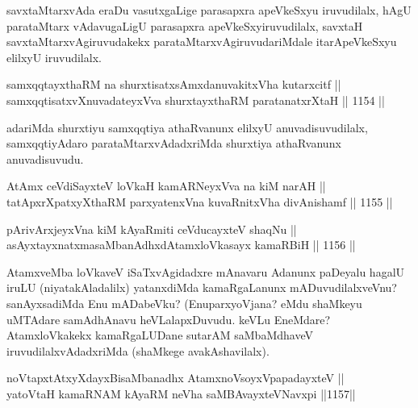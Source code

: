 \begin{artha}
savxtaMtarxvAda eraDu vasutxgaLige parasapxra apeVkeSxyu iruvudilalx, hAgU parataMtarx vAdavugaLigU parasapxra apeVkeSxyiruvudilalx, savxtaH savxtaMtarxvAgiruvudakekx parataMtarxvAgiruvudariMdale itarApeVkeSxyu elilxyU iruvudilalx.
\end{artha}

\begin{shl}
samxqqtayxthaRM na shurxtisatxsAmxdanuvakitxVha kutarxcitf ||  \\
samxqqtisatxvXnuvadateyxVva shurxtayxthaRM paratanatxrXtaH \hfill || 1154 ||  
\end{shl}

\begin{artha}
adariMda shurxtiyu samxqqtiya athaRvanunx elilxyU anuvadisuvudilalx, samxqqtiyAdaro parataMtarxvAdadxriMda shurxtiya athaRvanunx anuvadisuvudu.
\end{artha}



\begin{shl}
AtAmx ceVdiSayxteV loVkaH kamARNeyxVva na kiM narAH || \\
tatApxrXpatxyXthaRM parxyatenxVna kuvaRnitxVha divAnishamf \hfill || 1155 ||  
\end{shl}
				
\begin{shl}
pArivArxjeyxVna kiM kAyaRmiti ceVducayxteV shaqNu || \\
asAyxtayxnatxmasaMbanAdhxdAtamxloVkasayx kamaRBiH \hfill || 1156 ||  
\end{shl}

\begin{artha}
AtamxveMba loVkaveV iSaTxvAgidadxre mAnavaru Adanunx paDeyalu hagalU iruLU (niyatakAladalilx) yatanxdiMda kamaRgaLanunx mADuvudilalxveVnu? sanAyxsadiMda Enu mADabeVku? (EnuparxyoVjana? eMdu shaMkeyu uMTAdare \ndash  samAdhAnavu heVLalapxDuvudu. keVLu EneMdare? AtamxloVkakekx kamaRgaLUDane sutarAM saMbaMdhaveV iruvudilalxvAdadxriMda (shaMkege avakAshavilalx).
\end{artha}


\begin{shl}
noVtapxtAtxyXdayxBisaMbanadhx AtamxnoV\s soyxVpapadayxteV || \\
yatoV\s taH kamaRNAM kAyaRM neVha saMBAvayxteV\s Navxpi \hfill ||1157||  
\end{shl}
				
